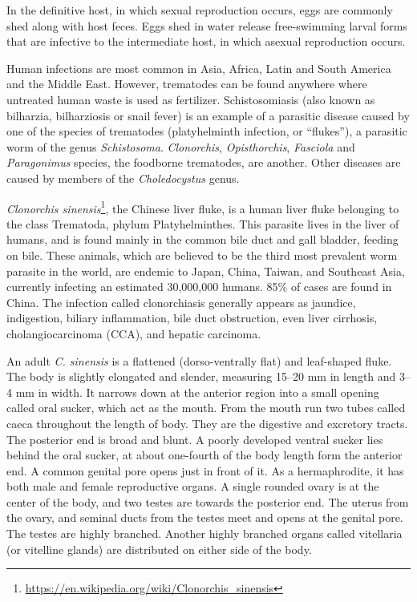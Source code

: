 \documentclass[]{book}
\let\rmarkdownfootnote\footnote%
\def\footnote{\protect\rmarkdownfootnote}
\renewcommand{\href}[2]{#2\footnote{\url{#1}}}
\theoremstyle{definition}
\theoremstyle{definition}
\theoremstyle{definition}
\theoremstyle{remark}
\begin{document}
In the definitive host, in which sexual reproduction occurs, eggs are
commonly shed along with host feces. Eggs shed in water release
free-swimming larval forms that are infective to the intermediate host,
in which asexual reproduction occurs.

Human infections are most common in Asia, Africa, Latin and South
America and the Middle East. However, trematodes can be found anywhere
where untreated human waste is used as fertilizer. Schistosomiasis (also
known as bilharzia, bilharziosis or snail fever) is an example of a
parasitic disease caused by one of the species of trematodes
(platyhelminth infection, or ``flukes''), a parasitic worm of the genus
\emph{Schistosoma}. \emph{Clonorchis}, \emph{Opisthorchis}, \emph{Fasciola} and \emph{Paragonimus} species,
the foodborne trematodes, are another. Other diseases are caused by
members of the \emph{Choledocystus} genus.


\href{https://en.wikipedia.org/wiki/Clonorchis_sinensis}{\emph{Clonorchis
sinensis}}, the Chinese liver fluke, is a human liver fluke belonging to
the class Trematoda, phylum Platyhelminthes. This parasite lives in the
liver of humans, and is found mainly in the common bile duct and gall
bladder, feeding on bile. These animals, which are believed to be the
third most prevalent worm parasite in the world, are endemic to Japan,
China, Taiwan, and Southeast Asia, currently infecting an estimated
30,000,000 humans. 85\% of cases are found in China. The infection
called clonorchiasis generally appears as jaundice, indigestion, biliary
inflammation, bile duct obstruction, even liver cirrhosis,
cholangiocarcinoma (CCA), and hepatic carcinoma.

An adult \emph{C. sinensis} is a flattened (dorso-ventrally flat) and
leaf-shaped fluke. The body is slightly elongated and slender, measuring
15--20 mm in length and 3--4 mm in width. It narrows down at the
anterior region into a small opening called oral sucker, which act as
the mouth. From the mouth run two tubes called caeca throughout the
length of body. They are the digestive and excretory tracts. The
posterior end is broad and blunt. A poorly developed ventral sucker lies
behind the oral sucker, at about one-fourth of the body length form the
anterior end. A common genital pore opens just in front of it. As a
hermaphrodite, it has both male and female reproductive organs. A single
rounded ovary is at the center of the body, and two testes are towards
the posterior end. The uterus from the ovary, and seminal ducts from the
testes meet and opens at the genital pore. The testes are highly
branched. Another highly branched organs called vitellaria (or vitelline
glands) are distributed on either side of the body.
\end{document}
